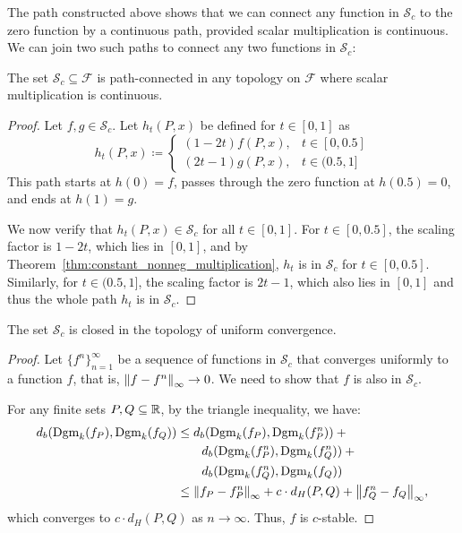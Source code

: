 The path constructed above shows that we can connect any function in
$\mathcal{S}_c$ to the zero function by a continuous path, provided scalar
multiplication is continuous. We can join two such paths to connect any two
functions in $\mathcal{S}_c$:
\begin{theorem}
    The set $\mathcal{S}_c \subseteq \mathcal{F}$ is path-connected in any
    topology on $\mathcal{F}$ where scalar multiplication is continuous.
\end{theorem}
\begin{proof}
    Let $f, g \in \mathcal{S}_c$.
    Let $h_t(P, x)$ be defined for $t \in [0, 1]$ as
    \begin{equation}
        h_t(P, x) \coloneqq \begin{cases}
            (1 - 2t)f(P, x), & t \in [0, 0.5] \\
            (2t - 1)g(P, x), & t \in (0.5, 1]
        \end{cases}
    \end{equation}
    This path starts at $h(0) = f$, passes through the zero function at $h(0.5) = 0$,
    and ends at $h(1) = g$.

    We now verify that $h_t(P, x) \in \mathcal{S}_c$ for all $t \in [0, 1]$.
    For $t \in [0, 0.5]$, the scaling factor is $1 - 2t$, which lies in
    $[0, 1]$, and by Theorem~\ref{thm:constant_nonneg_multiplication},
    $h_t$ is in $\mathcal{S}_c$ for $t \in [0, 0.5]$.
    Similarly, for $t \in (0.5, 1]$, the scaling factor is $2t - 1$, which also
    lies in $[0, 1]$ and thus the whole path $h_t$ is in $\mathcal{S}_c$.
\end{proof}

\begin{theorem}
    The set $\mathcal{S}_c$ is closed in the topology of uniform convergence.
\end{theorem}
\begin{proof}
    Let $\{f^n\}_{n = 1}^\infty$ be a sequence of functions in $\mathcal{S}_c$
    that converges uniformly to a function $f$, that is, $\norm{f - f^n}_\infty \to 0$.
    We need to show that $f$ is also in $\mathcal{S}_c$.

    For any finite sets $P, Q \subseteq \mathbb{R}$, by the triangle inequality, we have:
    \begin{align}
        d_b(\operatorname{Dgm}_k(f_P), \operatorname{Dgm}_k(f_Q)) & \leq d_b(\operatorname{Dgm}_k(f_P), \operatorname{Dgm}_k(f^n_P)) +{} \nonumber\\
        & \qquad d_b(\operatorname{Dgm}_k(f^n_P), \operatorname{Dgm}_k(f^n_Q)) +{} \nonumber\\
        & \qquad d_b(\operatorname{Dgm}_k(f^n_Q), \operatorname{Dgm}_k(f_Q)) \\
        & \leq \norm{f_P - f^n_P}_\infty + c \cdot d_H(P, Q) + \norm{f^n_Q - f_Q}_\infty,
    \end{align}
    which converges to $c \cdot d_H(P, Q)$ as $n \to \infty$.
    Thus, $f$ is $c$-stable.
\end{proof}

